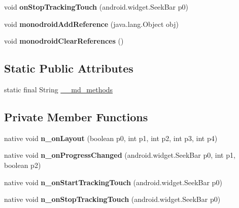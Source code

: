 \begin{DoxyCompactItemize}
void {\bfseries on\+Stop\+Tracking\+Touch} (android.\+widget.\+Seek\+Bar p0)
\item 
\mbox{\label{classmd5b60ffeb829f638581ab2bb9b1a7f4f3f_1_1SliderRenderer_a52c4922dec0b09c2a4d75e7488624539}} 
void {\bfseries monodroid\+Add\+Reference} (java.\+lang.\+Object obj)
\item 
\mbox{\label{classmd5b60ffeb829f638581ab2bb9b1a7f4f3f_1_1SliderRenderer_a9db5ee8d3adfe5077ce514f56e2a5984}} 
void {\bfseries monodroid\+Clear\+References} ()
\end{DoxyCompactItemize}
\subsection*{Static Public Attributes}
\begin{DoxyCompactItemize}
\item 
static final String \hyperlink{classmd5b60ffeb829f638581ab2bb9b1a7f4f3f_1_1SliderRenderer_abd36f56a20d51aa82400faf5b2db4536}{\+\_\+\+\_\+md\+\_\+methods}
\end{DoxyCompactItemize}
\subsection*{Private Member Functions}
\begin{DoxyCompactItemize}
\item 
\mbox{\label{classmd5b60ffeb829f638581ab2bb9b1a7f4f3f_1_1SliderRenderer_a77b7da7854dd07e25a132e99b1f712ad}} 
native void {\bfseries n\+\_\+on\+Layout} (boolean p0, int p1, int p2, int p3, int p4)
\item 
\mbox{\label{classmd5b60ffeb829f638581ab2bb9b1a7f4f3f_1_1SliderRenderer_a48491426a16d1d4462c9101a1aab8b4e}} 
native void {\bfseries n\+\_\+on\+Progress\+Changed} (android.\+widget.\+Seek\+Bar p0, int p1, boolean p2)
\item 
\mbox{\label{classmd5b60ffeb829f638581ab2bb9b1a7f4f3f_1_1SliderRenderer_a2ee7717dd05e5df6b6ecce7b38531ede}} 
native void {\bfseries n\+\_\+on\+Start\+Tracking\+Touch} (android.\+widget.\+Seek\+Bar p0)
\item 
\mbox{\label{classmd5b60ffeb829f638581ab2bb9b1a7f4f3f_1_1SliderRenderer_a432e06931257e3032239761823cb6329}} 
native void {\bfseries n\+\_\+on\+Stop\+Tracking\+Touch} (android.\+widget.\+Seek\+Bar p0)
\end{DoxyCompactItemize}
